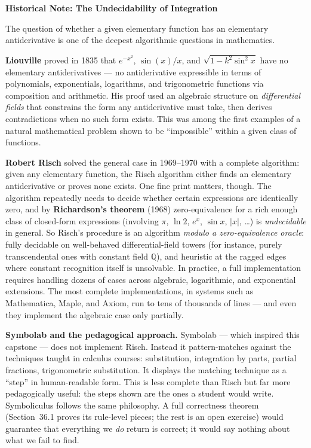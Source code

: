 \documentclass[12pt, openany]{book}
\theoremstyle{plain}
\theoremstyle{definition}
\theoremstyle{remark}
\newcommand{\Q}{\mathbb{Q}}
\begin{document}
\begin{remarkbox}
\textbf{Historical Note: The Undecidability of Integration}

The question of whether a given elementary function has an elementary antiderivative is one of the deepest algorithmic questions in mathematics.

\textbf{Liouville} proved in 1835 that $e^{-x^2}$, $\sin(x)/x$, and $\sqrt{1-k^2\sin^2 x}$ have no elementary antiderivatives --- no antiderivative expressible in terms of polynomials, exponentials, logarithms, and trigonometric functions via composition and arithmetic. His proof used an algebraic structure on \emph{differential fields} that constrains the form any antiderivative must take, then derives contradictions when no such form exists. This was among the first examples of a natural mathematical problem shown to be ``impossible'' within a given class of functions.

\textbf{Robert Risch} solved the general case in 1969--1970 with a complete algorithm: given any elementary function, the Risch algorithm either finds an elementary antiderivative or proves none exists. One fine print matters, though. The algorithm repeatedly needs to decide whether certain expressions are identically zero, and by \textbf{Richardson's theorem} (1968) zero-equivalence for a rich enough class of closed-form expressions (involving $\pi$, $\ln 2$, $e^x$, $\sin x$, $|x|$, \ldots) is \emph{undecidable} in general. So Risch's procedure is an algorithm \emph{modulo a zero-equivalence oracle}: fully decidable on well-behaved differential-field towers (for instance, purely transcendental ones with constant field $\Q$), and heuristic at the ragged edges where constant recognition itself is unsolvable. In practice, a full implementation requires handling dozens of cases across algebraic, logarithmic, and exponential extensions. The most complete implementations, in systems such as Mathematica, Maple, and Axiom, run to tens of thousands of lines --- and even they implement the algebraic case only partially.

\textbf{Symbolab and the pedagogical approach.} Symbolab --- which inspired this capstone --- does not implement Risch. Instead it pattern-matches against the techniques taught in calculus courses: substitution, integration by parts, partial fractions, trigonometric substitution. It displays the matching technique as a ``step'' in human-readable form. This is less complete than Risch but far more pedagogically useful: the steps shown are the ones a student would write. Symboliculus follows the same philosophy. A full correctness theorem (Section~36.1 proves its rule-level pieces; the rest is an open exercise) would guarantee that everything we \emph{do} return is correct; it would say nothing about what we fail to find.
\end{remarkbox}
\color{black}
\end{document}
